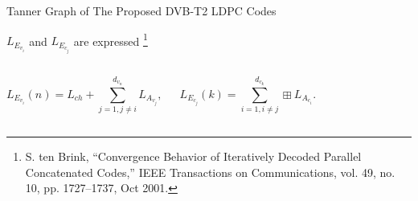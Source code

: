 \documentclass[11pt, aspectratio=169]{beamer}
\newcommand\blfootnote[1]{%
  \begingroup
  \renewcommand\thefootnote{}\footnote{#1}%
  \addtocounter{footnote}{-1}%
  \endgroup
}
\begin{document}
\begin{frame}{Tanner Graph of The Proposed DVB-T2 LDPC Codes}
\begin{figure}
		\label{fig:tg}
	\end{figure}
	\vspace{-0.45cm}
$L_{E_{v_{i}}}$ and $L_{E_{c_{j}}}$ are expressed\blfootnote{\tiny{S. ten Brink, “Convergence Behavior of Iteratively Decoded Parallel Concatenated Codes,” IEEE Transactions on Communications, vol. 49, no. 10, pp. 1727–1737, Oct 2001.}}
\begin{columns}
\vspace{-0.2cm}
\begin{equation}
L_{E_{v_{i}}}(n)=L_{ch}+\sum_{j=1,j\neq i}^{d_{v_{n}}} L_{A_{v_j}},
\end{equation}

\vspace{-0.1cm}
\begin{equation}
L_{E_{c_{j}}}(k)=\sum_{i=1,i\neq j}^{d_{c_{k}}}\boxplus L_{A_{c_{i}}}.
\end{equation}


\end{columns}

\end{frame}
\end{document}
